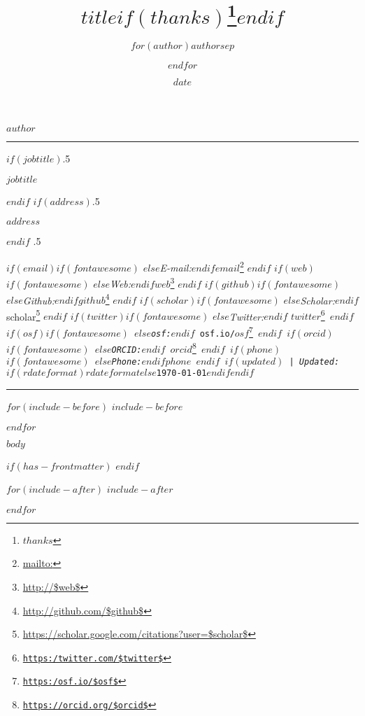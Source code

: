 \documentclass[
$if(fontsize)$
  $fontsize$,
$endif$
$if(papersize)$
  $papersize$paper,
$endif$
$for(classoption)$
  $classoption$$sep$,
$endfor$
]{$documentclass$}
\title{$title$$if(thanks)$\thanks{$thanks$}$endif$}
\author{$for(author)$$author$$sep$ \and $endfor$}
\date{$date$}
\DeclareRobustCommand{\href}[2]{#2\footnote{\url{#1}}}
\begin{document}
\centerline{\huge \bf $author$}

\vspace{2 mm}

\hrule

\vspace{2 mm}
$if(jobtitle)$\moveleft.5\hoffset\centerline{$jobtitle$}$endif$
$if(address)$\moveleft.5\hoffset\centerline{$address$}$endif$
\moveleft.5\hoffset\centerline{
$if(email)$$if(fontawesome)$\raisebox{-0.15\height}{\faEnvelopeO} \hspace{1 mm}$else$\emph{E-mail:}$endif$\href{mailto:}{$email$} \hspace{1 mm}$endif$
$if(web)$$if(fontawesome)$\raisebox{-0.15\height}{\faGlobe} \hspace{1 mm}$else$\emph{Web:}$endif$\href{http://$web$}{$web$} \hspace{1 mm}$endif$
$if(github)$$if(fontawesome)$\raisebox{-0.15\height}{\faGithub} \hspace{1 mm}$else$\emph{Github:}$endif$\href{http://github.com/$github$}{$github$} \hspace{1 mm} $endif$
$if(scholar)$$if(fontawesome)$\raisebox{-0.15\height}{\faGraduationCap} \hspace{1 mm}$else$\emph{Scholar:}$endif$\href{https://scholar.google.com/citations?user=$scholar$}{scholar} \hspace{1 mm} $endif$ 
$if(twitter)$$if(fontawesome)$\raisebox{-0.15\height}{\faTwitter} \hspace{1 mm}$else$\emph{Twitter:}$endif$ \href{https:/twitter.com/$twitter$}{\tt $twitter$} \hspace{1 mm} $endif$
$if(osf)$$if(fontawesome)$\raisebox{-0.15\height}{\faUnlock} \hspace{1 mm}$else$\emph{osf:}$endif$ \href{https:/osf.io/$osf$}{\tt osf.io/$osf$} \hspace{1 mm} $endif$
$if(orcid)$$if(fontawesome)$ \hspace{.5 mm}$else$\emph{ORCID:}$endif$ \href{https://orcid.org/$orcid$}{\tt $orcid$} \hspace{1 mm} $endif$
$if(phone)$$if(fontawesome)$ \raisebox{-0.15\height}{\faPhone} \hspace{1 mm}$else$\emph{Phone:}$endif$$phone$  \hspace{1 mm} $endif$
$if(updated)$ | \emph{Updated:} $if(rdateformat)$$rdateformat$$else$\apstylekinda\today$endif$$endif$
}


\vspace{2 mm}

\hrule

$for(include-before)$
$include-before$

$endfor$

$body$

$if(has-frontmatter)$
\backmatter
$endif$

$for(include-after)$
$include-after$

$endfor$
\end{document}
